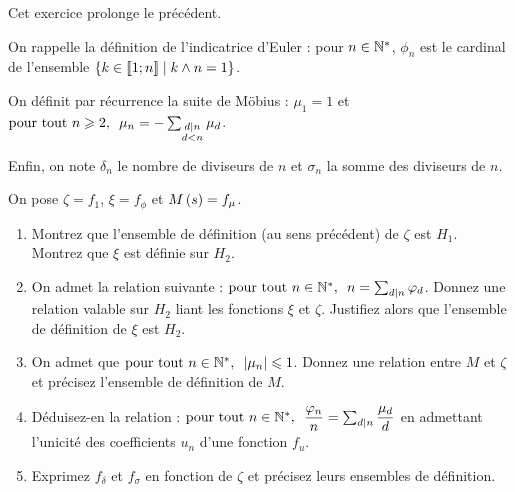 \begin{exoss}[Exercice 30]
Cet exercice prolonge le précédent.

On rappelle la définition de l'indicatrice d'Euler : pour \(n\in\mathbb{N}^*\), \(\phi_n\) est le cardinal de l'ensemble \(\left\lbrace k\in\left\llbracket1;n\right\rrbracket\;\middle|\; k\land n=1\right\rbrace\).

On définit par récurrence la suite de Möbius : \(\mu_1=1\) et \(\quantifs{\tpt n\geq2}\mu_n=-\sum_{\substack{d\divise n \\ d<n}}\mu_d\).

Enfin, on note \(\delta_n\) le nombre de diviseurs de \(n\) et \(\sigma_n\) la somme des diviseurs de \(n\).

On pose \(\zeta=f_1\), \(\xi=f_\phi\) et \(M\left(s\right)=f_\mu\).

\begin{enumerate}
    \item Montrez que l'ensemble de définition (au sens précédent) de \(\zeta\) est \(H_1\). Montrez que \(\xi\) est définie sur \(H_2\). \\
    \item On admet la relation suivante : \(\quantifs{\tpt n\in\Ns}n=\sum_{d\divise n}\phi_d\). Donnez une relation valable sur \(H_2\) liant les fonctions \(\xi\) et \(\zeta\). Justifiez alors que l'ensemble de définition de \(\xi\) est \(H_2\). \\
    \item On admet que \(\quantifs{\tpt n\in\Ns}\abs{\mu_n}\leq1\). Donnez une relation entre \(M\) et \(\zeta\) et précisez l'ensemble de définition de \(M\). \\
    \item Déduisez-en la relation : \(\quantifs{\tpt n\in\Ns}\dfrac{\phi_n}{n}=\sum_{d\divise n}\dfrac{\mu_d}{d}\) en admettant l'unicité des coefficients \(u_n\) d'une fonction \(f_u\). \\
    \item Exprimez \(f_\delta\) et \(f_\sigma\) en fonction de \(\zeta\) et précisez leurs ensembles de définition.
\end{enumerate}
\end{exoss}

\begin{corr}
\end{corr}

